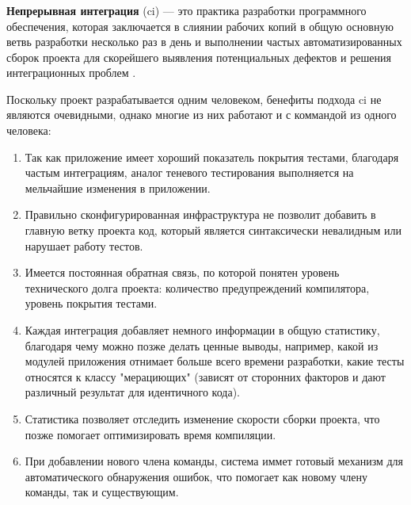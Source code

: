 \subsubsection{}
\label{sec:testing:ci:ci}

\textbf{Непрерывная интеграция} (\gls{ci}) — это практика разработки программного обеспечения, которая заключается в слиянии рабочих копий в общую основную ветвь разработки несколько раз в день и выполнении частых автоматизированных сборок проекта для скорейшего выявления потенциальных дефектов и решения интеграционных проблем \cite{wiki:ci}. 

Поскольку проект разрабатывается одним человеком, бенефиты подхода \gls{ci} не являются очевидными, однако многие из них работают и с коммандой из одного человека:

\begin{enumerate}
	\item Так как приложение имеет хороший показатель покрытия тестами, благодаря частым интеграциям, аналог теневого тестирования выполняется на мельчайшие изменения в приложении.
	\item Правильно сконфигурированная инфраструктура не позволит добавить в главную ветку проекта код, который является синтаксически невалидным или нарушает работу тестов.
	\item Имеется постоянная обратная связь, по которой понятен уровень технического долга проекта: количество предупреждений компилятора, уровень покрытия тестами.
	\item Каждая интеграция добавляет немного информации в общую статистику, благодаря чему можно позже делать ценные выводы, например, какой из модулей приложения отнимает больше всего времени разработки, какие тесты относятся к классу "мерациющих" (зависят от сторонних факторов и дают различный результат для идентичного кода).
	\item Статистика позволяет отследить изменение скорости сборки проекта, что позже помогает оптимизировать время компиляции.
	\item При добавлении нового члена команды, система иммет готовый механизм для автоматического обнаружения ошибок, что помогает как новому члену команды, так и существующим.
\end{enumerate}